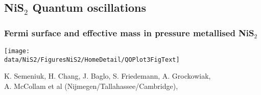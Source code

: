 \subsection{NiS$_2$ Quantum oscillations}
\begin{frame}[label=NiS2Mass]
  \frametitle{Fermi surface and effective mass in pressure metallised NiS$_2$}
\centerline{\texttt{[image: \\data/NiS2/FiguresNiS2/HomeDetail/QOPlot3FigText]}}
%
%


\vspace*{\fill}
\centerline{\makebox[\linewidth]{\rule{0.85\textwidth}{0.4pt}}}
\begin{center}
{\scriptsize K. Semeniuk, H. Chang, J. Baglo, S. Friedemann, A. Grockowiak, \\
A. McCollam et al (Nijmegen/Tallahassee/Cambridge),  }
\end{center}

\end{frame}





